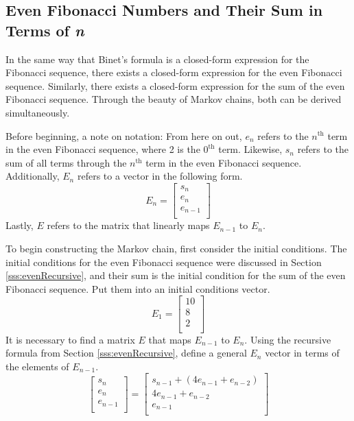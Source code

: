 \documentclass[titlepage]{article}
\begin{document}
\subsection{Even Fibonacci Numbers and Their Sum in Terms of \emph{n}}
In the same way that Binet's formula is a closed-form expression for the Fibonacci sequence, there exists a closed-form expression for the even Fibonacci sequence. Similarly, there exists a closed-form expression for the sum of the even Fibonacci sequence. Through the beauty of Markov chains, both can be derived simultaneously.\par
Before beginning, a note on notation: From here on out, $e_n$ refers to the $n^\text{th}$ term in the even Fibonacci sequence, where 2 is the $0^\text{th}$ term. Likewise, $s_n$ refers to the sum of all terms through the $n^\text{th}$ term in the even Fibonacci sequence. Additionally, $E_n$ refers to a vector in the following form.
\begin{equation*}
    E_n =
    \begin{bmatrix}
        s_n\\
        e_n\\
        e_{n-1}\\
    \end{bmatrix}
\end{equation*}
Lastly, $E$ refers to the matrix that linearly maps $E_{n-1}$ to $E_n$.\par
To begin constructing the Markov chain, first consider the initial conditions. The initial conditions for the even Fibonacci sequence were discussed in Section \ref{sss:evenRecursive}, and their sum is the initial condition for the sum of the even Fibonacci sequence. Put them into an initial conditions vector.
\begin{equation*}
    E_1 =
    \begin{bmatrix}
        10\\
        8\\
        2\\
    \end{bmatrix}
\end{equation*}
It is necessary to find a matrix $E$ that maps $E_{n-1}$ to $E_n$. Using the recursive formula from Section \ref{sss:evenRecursive}, define a general $E_n$ vector in terms of the elements of $E_{n-1}$.
\begin{equation*}
    \begin{bmatrix}
        s_n\\
        e_n\\
        e_{n-1}\\
    \end{bmatrix}
    =
    \begin{bmatrix}
        s_{n-1}+(4e_{n-1}+e_{n-2})\\
        4e_{n-1}+e_{n-2}\\
        e_{n-1}\\
    \end{bmatrix}
\end{equation*}
\end{document}
